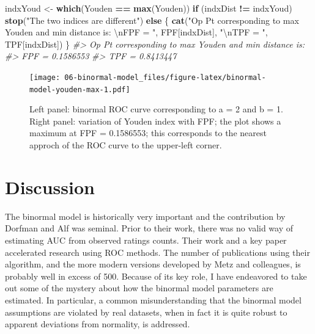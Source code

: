 \documentclass[
]{book}
\newenvironment{Shaded}{\begin{snugshade}}{\end{snugshade}}
\newcommand{\CharTok}[1]{\textcolor[rgb]{0.31,0.60,0.02}{#1}}
\newcommand{\CommentTok}[1]{\textcolor[rgb]{0.56,0.35,0.01}{\textit{#1}}}
\newcommand{\ControlFlowTok}[1]{\textcolor[rgb]{0.13,0.29,0.53}{\textbf{#1}}}
\newcommand{\KeywordTok}[1]{\textcolor[rgb]{0.13,0.29,0.53}{\textbf{#1}}}
\newcommand{\NormalTok}[1]{#1}
\newcommand{\OperatorTok}[1]{\textcolor[rgb]{0.81,0.36,0.00}{\textbf{#1}}}
\newcommand{\StringTok}[1]{\textcolor[rgb]{0.31,0.60,0.02}{#1}}
\begin{document}
\begin{Shaded}
\begin{Highlighting}[]
\NormalTok{indxYoud <-}\StringTok{ }\KeywordTok{which}\NormalTok{(Youden }\OperatorTok{==}\StringTok{ }\KeywordTok{max}\NormalTok{(Youden))}
\ControlFlowTok{if}\NormalTok{ (indxDist }\OperatorTok{!=}\StringTok{ }\NormalTok{indxYoud) }\KeywordTok{stop}\NormalTok{(}\StringTok{"The two indices are different"}\NormalTok{) }\ControlFlowTok{else}\NormalTok{ \{}
  \KeywordTok{cat}\NormalTok{(}\StringTok{"Op Pt corresponding to max Youden and min distance is: }\CharTok{\textbackslash{}n}\StringTok{FPF = "}\NormalTok{, }
\NormalTok{      FPF[indxDist], }
      \StringTok{"}\CharTok{\textbackslash{}n}\StringTok{TPF = "}\NormalTok{, }
\NormalTok{      TPF[indxDist])}
\NormalTok{\}}
\CommentTok{#> Op Pt corresponding to max Youden and min distance is: }
\CommentTok{#> FPF =  0.1586553 }
\CommentTok{#> TPF =  0.8413447}
\end{Highlighting}
\end{Shaded}

\begin{figure}
\centering
\texttt{[image: 06-binormal-model\_files/figure-latex/binormal-model-youden-max-1.pdf]}
\caption{\label{fig:binormal-model-youden-max}Left panel: binormal ROC curve corresponding to a = 2 and b = 1. Right panel: variation of Youden index with FPF; the plot shows a maximum at FPF = 0.1586553; this corresponds to the nearest approch of the ROC curve to the upper-left corner.}
\end{figure}

\hypertarget{binormal-model-discussion}{%
\section{Discussion}\label{binormal-model-discussion}}

The binormal model is historically very important and the contribution by Dorfman and Alf \citep{RN1081} was seminal. Prior to their work, there was no valid way of estimating AUC from observed ratings counts. Their work and a key paper \citep{RN1487} accelerated research using ROC methods. The number of publications using their algorithm, and the more modern versions developed by Metz and colleagues, is probably well in excess of 500. Because of its key role, I have endeavored to take out some of the mystery about how the binormal model parameters are estimated. In particular, a common misunderstanding that the binormal model assumptions are violated by real datasets, when in fact it is quite robust to apparent deviations from normality, is addressed.
\end{document}
